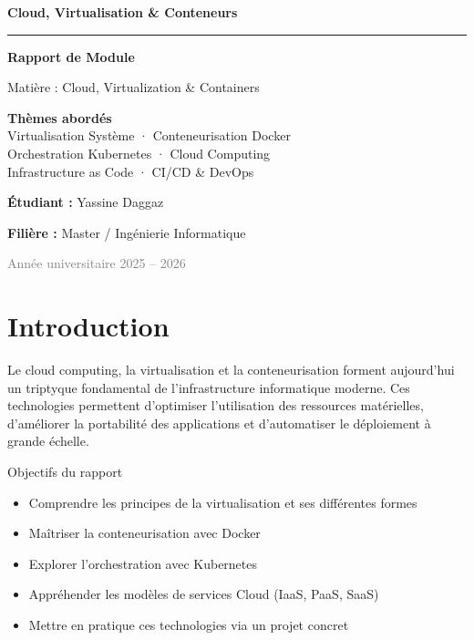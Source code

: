\documentclass[12pt,a4paper]{article}
\begin{document}
\begin{titlepage}
\centering
\vspace*{2cm}
{\Huge\bfseries\color{primary} Cloud, Virtualisation \& Conteneurs\par}
\vspace{0.5cm}
{\large\color{gray}\rule{0.6\textwidth}{1pt}\par}
\vspace{1cm}
{\Large\bfseries Rapport de Module\par}
\vspace{0.5cm}
{\large Matière : Cloud, Virtualization \& Containers\par}
\vspace{2cm}

\begin{tcolorbox}[colback=blue!5,colframe=primary,width=0.75\textwidth]
\centering
\textbf{Thèmes abordés}\\[6pt]
Virtualisation Système · Conteneurisation Docker\\
Orchestration Kubernetes · Cloud Computing\\
Infrastructure as Code · CI/CD \& DevOps
\end{tcolorbox}

\vfill
{\large\textbf{Étudiant :} Yassine Daggaz\par}
{\large\textbf{Filière :} Master / Ingénierie Informatique\par}
\vspace{0.5cm}
{\large\textcolor{gray}{Année universitaire 2025 -- 2026}\par}
\end{titlepage}

\tableofcontents
\newpage

\section{Introduction}

Le cloud computing, la virtualisation et la conteneurisation forment aujourd'hui un triptyque fondamental de l'infrastructure informatique moderne. Ces technologies permettent d'optimiser l'utilisation des ressources matérielles, d'améliorer la portabilité des applications et d'automatiser le déploiement à grande échelle.

\begin{keybox}{Objectifs du rapport}
\begin{itemize}[noitemsep]
    \item Comprendre les principes de la virtualisation et ses différentes formes
    \item Maîtriser la conteneurisation avec Docker
    \item Explorer l'orchestration avec Kubernetes
    \item Appréhender les modèles de services Cloud (IaaS, PaaS, SaaS)
    \item Mettre en pratique ces technologies via un projet concret
\end{itemize}
\end{keybox}
\end{document}
